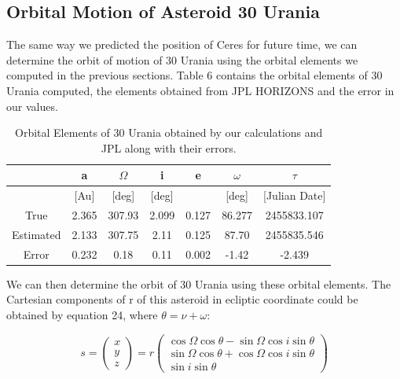 \documentclass[letterpaper,12pt]{article}
\begin{document}
\subsection{Orbital Motion of Asteroid 30 Urania}
The same way we predicted the position of Ceres for future time, we can determine the orbit of motion of 30 Urania using the orbital elements we computed in the previous sections. Table 6 contains the orbital elements of 30 Urania computed, the elements obtained from JPL HORIZONS and the error in our values.


\FloatBarrier
\begin{table}[h!]
\caption{Orbital Elements of 30 Urania obtained by our calculations and JPL along with their errors.} %
\centering %
\begin{tabular}{| c | c | c | c | c | c | c |} %
\hline %
 & a & \begin{math} \Omega \end{math}  & i & e & \begin{math} \omega \end{math}  & \begin{math} \tau \end{math} \\ [0.5ex] %
\hline %
  & [Au]  &  [deg] &[deg] & & [deg] & [Julian Date] \\ \hline 
True & 2.365 & 307.93  &  2.099  & 0.127 &  86.277 & 2455833.107\\ \hline
Estimated & 2.133 &  307.75 & 2.11 &  0.125 & 87.70 & 2455835.546 \\ \hline
Error & 0.232 & 0.18  &  0.11   &  0.002  & -1.42 & -2.439\\[1ex] %
\hline %
\end{tabular}
\label{table:nonlin} %
\end{table}
\FloatBarrier

We can then determine the orbit of 30 Urania using these orbital elements. The Cartesian components of r of this asteroid in ecliptic coordinate could be obtained by equation 24, where \begin{math} \theta = \nu + \omega \end{math}:

\begin{equation}
s=
\begin{pmatrix}
  x \\
  y \\
  z
 \end{pmatrix} 
  =r
\begin{pmatrix}
\cos \Omega \cos \theta - \sin \Omega \cos i \sin \theta \\ 
 \sin \Omega \cos \theta+ \cos \Omega \cos i \sin \theta \\ 
 \sin i \sin \theta
\end{pmatrix}
\end{equation}
\end{document}
